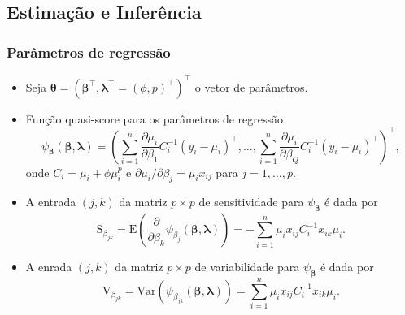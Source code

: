 \documentclass[10pt, aspectratio=169]{beamer}\usepackage[]{graphicx}\usepackage[]{color}
\begin{document}
\subsection{Estimação e Inferência}
\begin{frame}[c]
\frametitle{Parâmetros de regressão}
\begin{itemize}
\item Seja $\boldsymbol{\theta} = (\boldsymbol{\beta}^\top, \boldsymbol{\lambda}^\top = (\phi, p)^\top)^\top$ 
o vetor de parâmetros.
\item Função quasi-score para os parâmetros de regressão
\begin{equation*}
\psi_{\boldsymbol{\beta}}(\boldsymbol{\beta}, \boldsymbol{\lambda}) = \left (\sum_{i=1}^n \frac{\partial \mu_i}{\partial \beta_1}C^{-1}_i(y_i - \mu_i)^\top, \ldots, \sum_{i=1}^n \frac{\partial \mu_i}{\partial \beta_Q}C^{-1}_i(y_i - \mu_i)^\top  \right )^\top,
\end{equation*}
onde $C_i = \mu_i + \phi \mu_i^p$ e $\partial \mu_i/\partial \beta_j = \mu_i x_{ij}$ para $j = 1, \ldots, p$.
\item A entrada $(j,k)$ da matriz $p \times p$ de sensitividade para $\psi_{\boldsymbol{\beta}}$ é dada por
\begin{equation}
\label{Sbeta}
\mathrm{S}_{\beta_{jk}} = \mathrm{E}\left ( \frac{\partial}{\partial \beta_k} \psi_{\beta_j}(\boldsymbol{\beta}, \boldsymbol{\lambda})  \right ) = -\sum_{i=1}^n \mu_i x_{ij} C^{-1}_i x_{ik} \mu_i.
\end{equation}
\item A enrada $(j,k)$ da matriz $p \times p$  de variabilidade para $\psi_{\boldsymbol{\beta}}$ é dada por
\begin{equation}
\label{Vbeta}
\mathrm{V}_{\beta_{jk}} = \mathrm{Var}(\psi_{\beta_{jk}}(\boldsymbol{\beta}, \boldsymbol{\lambda})) = \sum_{i=1}^n \mu_i x_{ij} C^{-1}_i x_{ik} \mu_i.
\end{equation}
\end{itemize}
\end{frame}
\end{document}
